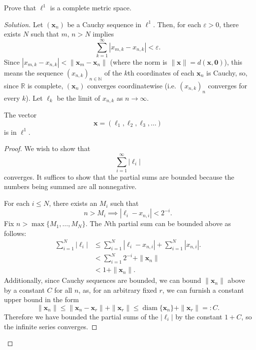 \documentclass[11pt]{scrartcl}
\providecommand{\eps}{\varepsilon}
\providecommand{\NN}{\mathbb N}
\providecommand{\RR}{\mathbb R}
\providecommand{\mb}[1]{\mathbf{#1}}
\newenvironment{soln}{\begin{proof}[Solution]}{\end{proof}}
\begin{document}
\pagebreak
\begin{problem}
	Prove that $\ell^1$ is a complete metric space.
\end{problem}
\begin{soln}
	Let $(\mb x_n)$ be a Cauchy sequence in $\ell^1$.
	Then, for each $\eps > 0$, there exists $N$ such that
	$m,\,n > N$ implies
	\[\sum_{k=1}^\infty |x_{m, k} - x_{n, k}| < \eps.\]
	Since $|x_{m, k} - x_{n, k}| < \|\mb x_m - \mb x_n\|$
	(where the norm is $\|\mb x\| = d(\mb x, \mb 0)$),
	this means the sequence $(x_{n,k})_{n\in\NN}$
	of the $k$th coordinates of each $\mb x_n$ is Cauchy,
	so, since $\RR$ is complete, $(\mb x_n)$ converges coordinatewise
	(i.e. $(x_{n,k})_n$ converges for every $k$).
	Let $\ell_k$ be the limit of $x_{n,k}$ as $n\to\infty$.
	
	\begin{claim}
		The vector
		\[\mb x = (\ell_1, \ell_2, \ell_3, \dots)\]
		is in $\ell^1$.
	\end{claim}
	\begin{proof}
		We wish to show that
		\[\sum_{i=1}^\infty |\ell_i|\]
		converges. It suffices to show that
		the partial sums are bounded because the numbers being summed
		are all nonnegative.
		
		For each $i\le N$, there exists an $M_i$ such that
		\[n > M_i\implies |\ell_i - x_{n,i}| < 2^{-i}.\]
		Fix $n > \max\{M_1, \dots, M_N\}$.
		The $N$th partial sum can be bounded above as follows:
		\begin{align*}
			\sum_{i=1}^N |\ell_i| &\le
			\sum_{i=1}^N |\ell_i - x_{n,i}| + \sum_{i=1}^N |x_{n,i}|.\\
			&< \sum_{i=1}^N 2^{-i} + \|\mb x_n\|\\
			&< 1 + \|\mb x_n\|.
		\end{align*}
		Additionally, since Cauchy sequences are bounded,
		we can bound $\|\mb x_n\|$ above by a constant $C$
		for all $n$, as, for an arbitrary fixed $r$,
		we can furnish a constant upper bound in the form
		\[\|\mb x_n\| \le \|\mb x_n - \mb x_r\| + \|\mb x_r\|
		\le \operatorname{diam}\{\mb x_n\} + \|\mb x_r\| =: C.\]
		Therefore we have bounded the partial sums of the $|\ell_i|$
		by the constant $1 + C$, so the infinite series converges.
	\end{proof}
	

\end{soln}
\end{document}
